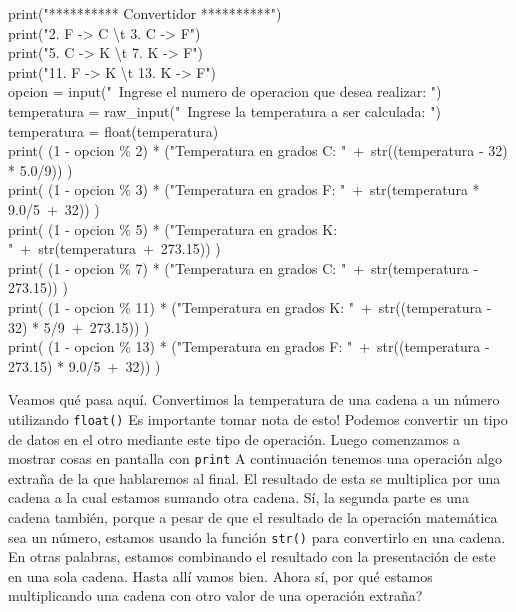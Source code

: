 \documentclass[10pt,letterpaper]{article}
\newcommand{\inlinecode}[1]{
\colorbox{light-gray}{\texttt{#1}}
}
\newenvironment{Code}
{
\begin{lrbox}{\selvestebox}%
\begin{minipage}{\dimexpr\columnwidth-2\fboxsep\relax}
\fontfamily{\ttdefault}\selectfont
}
{\end{minipage}\end{lrbox}%
\begin{center}
\colorbox{light-gray}{\usebox{\selvestebox}}
\end{center}
}
\begin{document}
\begin{Code}
print("********** Convertidor **********")\\
print("2. F -> C \textbackslash t  3. C -> F")\\
print("5. C -> K \textbackslash t  7. K -> F")\\
print("11. F -> K \textbackslash t 13. K -> F")\\
opcion = input("\ \hspace{-2mm}Ingrese el numero de operacion que desea realizar: ")\\
temperatura = raw\_input("\ \hspace{-2mm}Ingrese la temperatura a ser calculada: ")\\
temperatura = float(temperatura)\\
print( (1 - opcion \% 2) * ("Temperatura en grados C: "\ +\ str((temperatura - 32) * 5.0/9)) )\\
print( (1 - opcion \% 3) * ("Temperatura en grados F: "\ +\ str(temperatura * 9.0/5\ +\ 32)) )\\
print( (1 - opcion \% 5) * ("Temperatura en grados K: "\ +\ str(temperatura\ +\ 273.15)) )\\
print( (1 - opcion \% 7) * ("Temperatura en grados C: "\ +\ str(temperatura - 273.15)) )\\
print( (1 - opcion \% 11) * ("Temperatura en grados K: "\ +\ str((temperatura - 32) * 5/9\ +\ 273.15)) )\\
print( (1 - opcion \% 13) * ("Temperatura en grados F: "\ +\ str((temperatura - 273.15) * 9.0/5\ +\ 32)) )
\end{Code}

Veamos qu\'e pasa aqu\'i. Convertimos la temperatura de una cadena a un n\'umero utilizando \inlinecode{float()} Es importante tomar nota de esto! Podemos convertir un tipo de datos en el otro mediante este tipo de operaci\'on. Luego comenzamos a mostrar cosas en pantalla con \inlinecode{print} A continuaci\'on tenemos una operaci\'on algo extra\~na de la que hablaremos al final. El resultado de esta se multiplica por una cadena a la cual estamos sumando otra cadena. S\'i, la segunda parte es una cadena tambi\'en, porque a pesar de que el resultado de la operaci\'on matem\'atica sea un n\'umero, estamos usando la funci\'on \inlinecode{str()} para convertirlo en una cadena. En otras palabras, estamos combinando el resultado con la presentaci\'on de este en una sola cadena. Hasta all\'i vamos bien. Ahora s\'i, por qu\'e estamos multiplicando una cadena con otro valor de una operaci\'on extra\~na?\\
\end{document}
